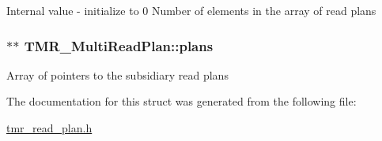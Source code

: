 Internal value - initialize to 0 Number of elements in the array of read plans \hypertarget{struct_t_m_r___multi_read_plan_5286a1547275c8206ec2bbf82118acea}{
\subsubsection[{plans}]{$\ast$$\ast$ {\bf TMR\_\-MultiReadPlan::plans}}}
\label{struct_t_m_r___multi_read_plan_5286a1547275c8206ec2bbf82118acea}


Array of pointers to the subsidiary read plans 

The documentation for this struct was generated from the following file:\begin{CompactItemize}
\item 
\hyperlink{tmr__read__plan_8h}{tmr\_\-read\_\-plan.h}\end{CompactItemize}
